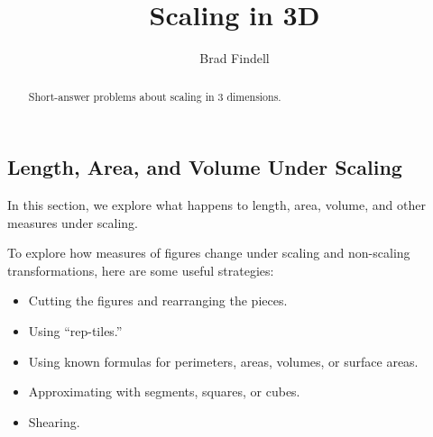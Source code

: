 \documentclass[nooutcomes]{ximera}
\title{Scaling in 3D}
\author{Brad Findell}
\begin{document}
\begin{abstract}
Short-answer problems about scaling in 3 dimensions. 
\end{abstract}
\maketitle




\subsection{Length, Area, and Volume Under Scaling}
In this section, we explore what happens to length, area, volume, and other measures under scaling.  

To explore how measures of figures change under scaling and non-scaling transformations, here are some useful strategies: 
\begin{itemize}
\item Cutting the figures and rearranging the pieces.  
\item Using ``rep-tiles.'' 
\item Using known formulas for perimeters, areas, volumes, or surface areas. 
\item Approximating with segments, squares, or cubes.  
\item Shearing. 
\end{itemize}

\end{document}
